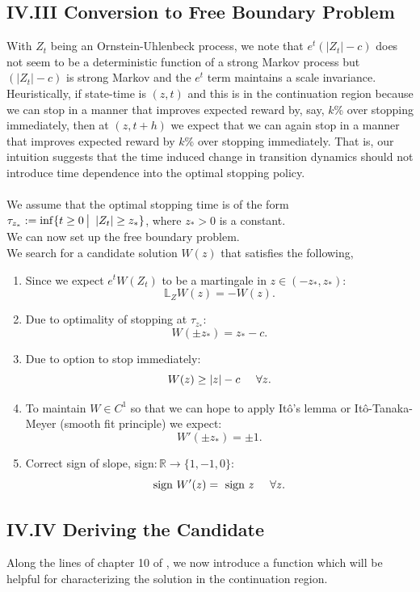\documentclass[12pt]{article}
\newcommand{\R}{\mathbb{R}}
\newcommand{\bL}{\mathbb{L}}
\newcommand{\quantifyspace}{\hspace{2px} \big | \hspace{5px}}
\newcommand{\spc}{\hspace{7 px}}
\theoremstyle{definition}
\begin{document}
\subsection*{IV.III Conversion to Free Boundary Problem}\label{sec:IV.III}
With $Z_t$ being an Ornstein-Uhlenbeck process, we note that $e^t (|Z_t| - c)$ does not seem to be a deterministic function of a strong Markov process but $(|Z_t| - c)$ is strong Markov and the $e^t$ term maintains a scale invariance. Heuristically, if state-time is $(z, t)$ and this is in the continuation region because we can stop in a manner that improves expected reward by, say, $k$\% over stopping immediately, then at $(z, t+h)$ we expect that we can again stop in a manner that improves expected reward by $k$\% over stopping immediately. That is, our intuition suggests that the time induced change in transition dynamics should not introduce time dependence into the optimal stopping policy. \\
\\
We assume that the optimal stopping time is of the form $\tau_{z_*} := \inf \{t \geq 0 \quantifyspace |Z_t| \geq z_*\}$, where $z_* > 0$ is a constant. \\
We can now set up the free boundary problem. \\
We search for a candidate solution $W(z)$ that satisfies the following,
\begin{enumerate}
    \item[(i)] Since we expect $e^t W(Z_t)$ to be a martingale in $z \in (-z_*, z_*)$:
    \[
        \bL_Z W(z) = - W(z).
    \]
    \item[(ii)] Due to optimality of stopping at $\tau_{z_*}$:
    \[
        W(\pm z_*) = z_* - c.
    \]
    \item[(iii)] Due to option to stop immediately:
    \[
        W(z) \geq |z| - c \spc \spc \forall z.
    \]
    \item[(iv)] To maintain $W \in C^1$ so that we can hope to apply Itô's lemma or Itô-Tanaka-Meyer (smooth fit principle) we expect:
    \[
        W'(\pm z_*) = \pm 1.
    \]
    \item[(v)] Correct sign of slope, sign$: \R \to \{1, -1, 0\}$:
    \[
        \text{sign } W'(z) = \text{ sign } z \spc \spc \forall z.
    \]
\end{enumerate}

\subsection*{IV.IV Deriving the Candidate}\label{sec:IV.IV}
Along the lines of chapter 10 of \cite{peskir2006}, we now introduce a function which will be helpful for characterizing the solution in the continuation region.
\end{document}
